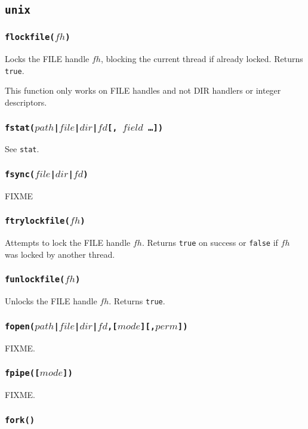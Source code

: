 \documentclass[11pt, oneside]{memoir}
\newcommand*{\true}[0]{\texttt{true}\xspace}
\newcommand*{\false}[0]{\texttt{false}\xspace}
\newcommand*{\fn}[1]{\texttt{#1}\xspace}
\newcounter{toccols}
\newenvironment{Module}[1]{
	\subsection{\texttt{#1}}
	\addtocontents{toc}{
		\protect\begin{multicols}{\value{toccols}}
	}
}{
	\addtocontents{toc}{\protect\end{multicols}}
}
\begin{document}
\begin{Module}{unix}
\subsubsection[\fn{flockfile}]{\fn{flockfile($fh$)}}

Locks the FILE handle $fh$, blocking the current thread if already locked. Returns \true.

This function only works on FILE handles and not DIR handlers or integer descriptors.

\subsubsection[\fn{fstat}]{\fn{fstat($path$|$file$|$dir$|$fd$[, $field$ \ldots])}}

See \fn{stat}.

\subsubsection[\fn{fsync}]{\fn{fsync($file$|$dir$|$fd$)}}

FIXME

\subsubsection[\fn{ftrylockfile}]{\fn{ftrylockfile($fh$)}}

Attempts to lock the FILE handle $fh$. Returns \true on success or \false if $fh$ was locked by another thread.

\subsubsection[\fn{funlockfile}]{\fn{funlockfile($fh$)}}

Unlocks the FILE handle $fh$. Returns \true.

\subsubsection[\fn{fopen}]{\fn{fopen($path$|$file$|$dir$|$fd$,[$mode$][,$perm$])}}

FIXME.

\subsubsection[\fn{fpipe}]{\fn{fpipe([$mode$])}}

FIXME.

\subsubsection[\fn{fork}]{\fn{fork()}}


\end{Module}
\end{document}
